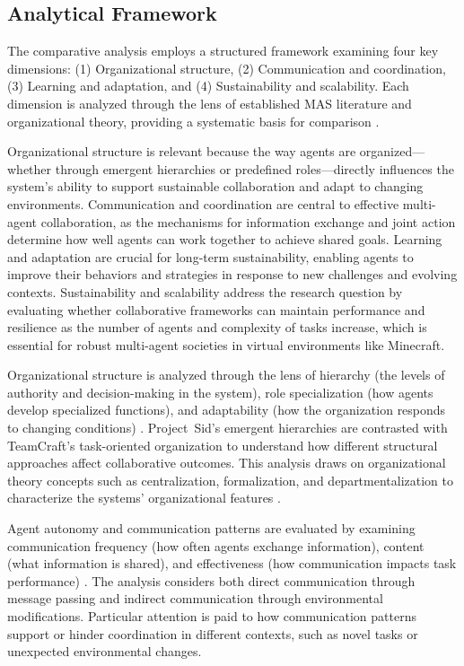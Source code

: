 \documentclass[a4paper, 12pt]{article}
\begin{document}
\subsection{Analytical Framework}

The comparative analysis employs a structured framework examining four key dimensions: (1) Organizational structure, (2) Communication and coordination, (3) Learning and adaptation, and (4) Sustainability and scalability. Each dimension is analyzed through the lens of established MAS literature and organizational theory, providing a systematic basis for comparison \autocite{Lhaksmana2018, Chen2024}.

Organizational structure is relevant because the way agents are organized---whether through emergent hierarchies or predefined roles---directly influences the system's ability to support sustainable collaboration and adapt to changing environments. Communication and coordination are central to effective multi-agent collaboration, as the mechanisms for information exchange and joint action determine how well agents can work together to achieve shared goals. Learning and adaptation are crucial for long-term sustainability, enabling agents to improve their behaviors and strategies in response to new challenges and evolving contexts. Sustainability and scalability address the research question by evaluating whether collaborative frameworks can maintain performance and resilience as the number of agents and complexity of tasks increase, which is essential for robust multi-agent societies in virtual environments like Minecraft.

Organizational structure is analyzed through the lens of hierarchy (the levels of authority and decision-making in the system), role specialization (how agents develop specialized functions), and adaptability (how the organization responds to changing conditions) \autocite{Lhaksmana2018, Chen2024}. Project~Sid's emergent hierarchies are contrasted with TeamCraft's task-oriented organization to understand how different structural approaches affect collaborative outcomes. This analysis draws on organizational theory concepts such as centralization, formalization, and departmentalization to characterize the systems' organizational features .

Agent autonomy and communication patterns are evaluated by examining communication frequency (how often agents exchange information), content (what information is shared), and effectiveness (how communication impacts task performance) \autocite{Shu2024, Qiu2024}. The analysis considers both direct communication through message passing and indirect communication through environmental modifications. Particular attention is paid to how communication patterns support or hinder coordination in different contexts, such as novel tasks or unexpected environmental changes.
\end{document}
